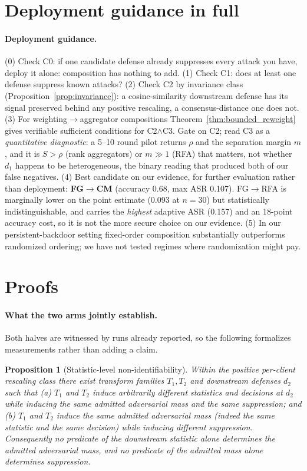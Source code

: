 \documentclass{article}
\newtheorem{proposition}{Proposition}
\begin{document}
\section{Deployment guidance in full}
\label{app:deployment}

\paragraph{Deployment guidance.} (0) Check C0: if one candidate defense already suppresses every attack you have, deploy it alone: composition has nothing to add. (1) Check C1: does at least one defense suppress known attacks? (2) Check C2 by invariance class (Proposition~\ref{prop:invariance}): a cosine-similarity downstream defense has its signal preserved behind any positive rescaling, a consensus-distance one does not. (3) For weighting$\to$aggregator compositions Theorem~\ref{thm:bounded_reweight} gives verifiable sufficient conditions for C2$\wedge$C3. Gate on C2; read C3 as a \emph{quantitative diagnostic}: a 5--10 round pilot returns $\rho$ and the separation margin $m$, and it is $S > \rho$ (rank aggregators) or $m \gg 1$ (RFA) that matters, not whether $d_1$ happens to be heterogeneous, the binary reading that produced both of our false negatives. (4) Best candidate on our evidence, for further evaluation rather than deployment: \textbf{FG$\to$CM} (accuracy 0.68, max ASR 0.107). FG$\to$RFA is marginally lower on the point estimate (0.093 at $n{=}30$) but statistically indistinguishable, and carries the \emph{highest} adaptive ASR (0.157) and an 18-point accuracy cost, so it is not the more secure choice on our evidence. (5) In our persistent-backdoor setting fixed-order composition substantially outperforms randomized ordering; we have not tested regimes where randomization might pay.

\section{Proofs}
\label{app:proofs}

\paragraph{What the two arms jointly establish.} Both halves are witnessed by runs already reported, so the following formalizes measurements rather than adding a claim.

\begin{proposition}[Statistic-level non-identifiability]
\label{prop:nonidentifiability}
Within the positive per-client rescaling class there exist transform families $T_1,T_2$ and downstream defenses $d_2$ such that
(a) $T_1$ and $T_2$ induce arbitrarily different statistics and \emph{decisions} at $d_2$ while inducing the \emph{same} admitted adversarial mass and the same suppression; and
(b) $T_1$ and $T_2$ induce the \emph{same} admitted adversarial mass (indeed the same statistic and the same decision) while inducing \emph{different} suppression.
Consequently no predicate of the downstream statistic alone determines the admitted adversarial mass, and no predicate of the admitted mass alone determines suppression.
\end{proposition}
\end{document}
